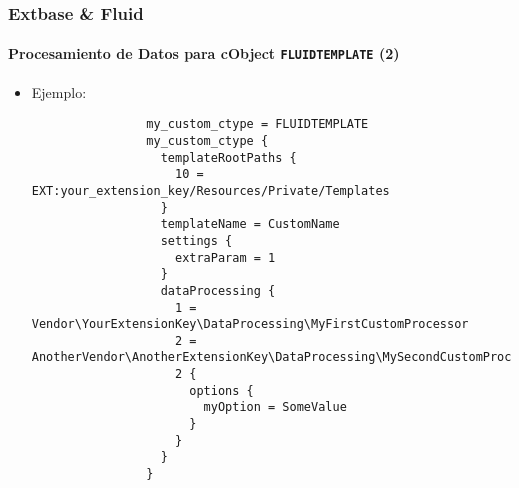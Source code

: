 \begin{frame}[fragile]
	\frametitle{Extbase \& Fluid}
	\framesubtitle{Procesamiento de Datos para cObject \texttt{FLUIDTEMPLATE} (2)}

	\lstset{basicstyle=\tiny\ttfamily}

	\begin{itemize}

		\item Ejemplo:

			\begin{lstlisting}
				my_custom_ctype = FLUIDTEMPLATE
				my_custom_ctype {
				  templateRootPaths {
				    10 = EXT:your_extension_key/Resources/Private/Templates
				  }
				  templateName = CustomName
				  settings {
				    extraParam = 1
				  }
				  dataProcessing {
				    1 = Vendor\YourExtensionKey\DataProcessing\MyFirstCustomProcessor
				    2 = AnotherVendor\AnotherExtensionKey\DataProcessing\MySecondCustomProcessor
				    2 {
				      options {
				        myOption = SomeValue
				      }
				    }
				  }
				}
			\end{lstlisting}

	\end{itemize}

\end{frame}

